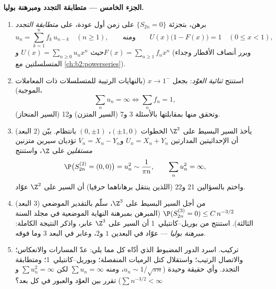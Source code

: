 \begin{problem}
\medskip
\noindent\textbf{الجزء الخامس --- متطابقة التجدد ومبرهنة بوليا.}
\begin{enumerate}[resume]
  \item برهن، بتجزئة $\{S_{2n} = 0\}$ على زمن أول عودة، على \emph{متطابقة
        التجدد}
        \[
        u_n = \sum_{k=1}^n f_k\,u_{n-k} \quad (n \geq 1),
        \qquad\text{ومنه}\qquad
        U(x)\bigl(1 - F(x)\bigr) = 1 \quad (0 \leq x < 1),
        \]
        حيث $U(x) = \sum_{n\geq0}u_nx^n$ و$F(x) =
        \sum_{n\geq1}f_nx^n$ (وبرر أنصاف الأقطار وجداء المتسلسلتين
        مع \cref{ch:b2:powerseries}).
  \item استنتج \emph{ثنائية العوْد}: بجعل $x
        \to 1^-$ (بالنهايات الرتيبة
        للمتسلسلات ذات المعاملات الموجبة)،
        \[
        \sum_n u_n = \infty \iff \sum_n f_n = 1 ,
        \]
        وتحقق منها بمقابلتها بالأسئلة 3 و7 (السير المتزن) و12 (السير
        المنحاز).
  \item (البعد $2$) يأخذ السير البسيط على $\Z^2$ الخطوات $(\pm1, 0)$،
        $(0, \pm1)$ بانتظام. بيّن أن الإحداثيتين المدارتين $U_n = X_n + Y_n$ و$V_n = X_n
        - Y_n$
        تؤديان سيرين متزنين \emph{مستقلين} على $\Z$، واستنتج
        \[
        \P\bigl(S^{(2)}_{2n} = (0,0)\bigr) = u_n^2 \sim
        \frac1{\pi n},
        \qquad \sum_n u_n^2 = \infty ,
        \]
        واختم بالسؤالين 21 و22 (اللذين ينتقل برهاناهما حرفيا) أن
        السير على $\Z^2$ عوّاد.
  \item (البعد $3$) من أجل السير البسيط على $\Z^3$، سلّم بالتقدير
        الموضعي $\P(S^{(3)}_{2n} = 0) \leq
        C\,n^{-3/2}$ (المبرهن بمبرهنة النهاية الموضعية في مجلد
        السنة الثالثة). استنتج من بوريل--كانتيلي~1 أن السير على
        $\Z^3$ عابر، واذكر النتيجة الكاملة: \emph{مبرهنة بوليا} ---
         عوّاد في البعدين $1$ و$2$،
        وعابر في البعد $3$ وما فوقه.
  \item تركيب. اسرد الدور المضبوط الذي أدّاه كل مما يلي: عدّ المسارات
        والانعكاس؛ والاتصال الرتيب؛ واستقلال كتل الرميات المنفصلة؛
        وبوريل--كانتيلي~1؛ ومتطابقة التجدد. وأي حقيقة  وحيدة
        ($u_n \sim 1/\sqrt{\pi n}$، ومنه $\sum u_n = \infty$ لكن $\sum u_n^2 = \infty$ و$\sum n^{-3/2} < \infty$) تقرر بين العوْد
        والعبور في كل بعد؟
\end{enumerate}
\end{problem}
